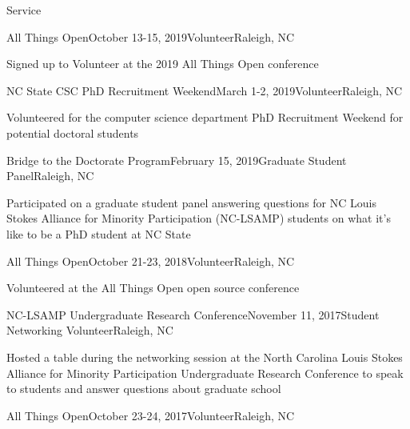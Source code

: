 \documentclass{resume} %
\begin{document}

\begin{rSection}{Service}

\begin{rSubsection}{All Things Open}{October 13-15, 2019}{Volunteer}{Raleigh, NC}
\item Signed up to Volunteer at the 2019 All Things Open conference
\end{rSubsection}
\begin{rSubsection}{NC State CSC PhD Recruitment Weekend}{March 1-2, 2019}{Volunteer}{Raleigh, NC}
\item Volunteered for the computer science department PhD Recruitment Weekend for potential doctoral students
\end{rSubsection}
\begin{rSubsection}{Bridge to the Doctorate Program}{February 15, 2019}{Graduate Student Panel}{Raleigh, NC}
\item Participated on a graduate student panel answering questions for NC Louis Stokes Alliance for Minority Participation (NC-LSAMP) students on what it's like to be a PhD student at NC State
\end{rSubsection}
\begin{rSubsection}{All Things Open}{October 21-23, 2018}{Volunteer}{Raleigh, NC}
\item Volunteered at the All Things Open open source conference
\end{rSubsection}
\begin{rSubsection}{NC-LSAMP Undergraduate Research Conference}{November 11, 2017}{Student Networking Volunteer}{Raleigh, NC}
\item Hosted a table during the networking session at the North Carolina Louis Stokes Alliance for Minority Participation Undergraduate Research Conference to speak to students and answer questions about graduate school
\end{rSubsection}
\begin{rSubsection}{All Things Open}{October 23-24, 2017}{Volunteer}{Raleigh, NC}

\end{rSubsection}
\end{rSection}
\end{document}
